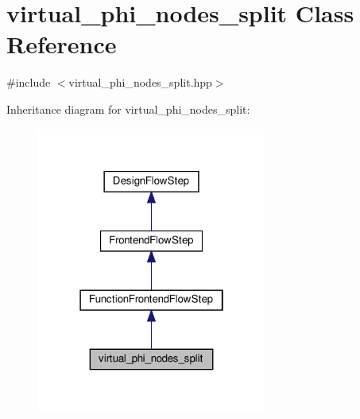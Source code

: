 \hypertarget{classvirtual__phi__nodes__split}{}\section{virtual\+\_\+phi\+\_\+nodes\+\_\+split Class Reference}
\label{classvirtual__phi__nodes__split}


{\ttfamily \#include $<$virtual\+\_\+phi\+\_\+nodes\+\_\+split.\+hpp$>$}



Inheritance diagram for virtual\+\_\+phi\+\_\+nodes\+\_\+split\+:
\nopagebreak
\begin{figure}[H]
\begin{center}
\leavevmode
\includegraphics[width=214pt]{d4/d6d/classvirtual__phi__nodes__split__inherit__graph}
\end{center}
\end{figure}


